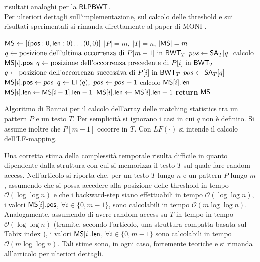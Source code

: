 risultati analoghi per la $\mbox{\rm {\sf RLPBWT}}$.\\
Per ulteriori dettagli sull'implementazione, sul calcolo delle
threshold e sui risultati sperimentali si rimanda direttamente al paper
di MONI \cite{moni}.
\begin{algorithm}
  \footnotesize
  \begin{algorithmic}[1]
    \State $\mbox{\rm {\sf MS}}\gets[(\mbox{\rm {\sf pos}} : 0, \mbox{\rm {\sf len}} : 0) \ldots (0, 0)]$
    \Comment $|P| = m$, $|T| = n$, $|\mbox{\rm {\sf MS}}| = m$
    \State $q\gets\mbox{posizione dell'ultima occorrenza di }P[m-1] \mbox{ in }
    \mbox{\rm {\sf BWT}}_T$ 
    \State $pos \gets \mbox{\rm {\sf SA}}_T[q]$
    \Comment calcolo $\mbox{\rm {\sf MS}}[i].\mbox{\rm {\sf pos}}$
    \State $q\gets\mbox{posizione dell'occorrenza precedente di }P[i] \mbox{ in
    } \mbox{\rm {\sf BWT}}_T$
    \Else
    \State $q\gets\mbox{posizione dell'occorrenza successiva di }P[i] \mbox{ in
    } \mbox{\rm {\sf BWT}}_T$
    \EndIf
    \State $pos\gets \mbox{\rm {\sf SA}}_T[q]$
    \EndIf
    \State $\mbox{\rm {\sf MS}}[i].\mbox{\rm {\sf pos}} \gets pos$
    \State $q\gets \mbox{\rm {\sf LF}}(q),\,\,pos\gets pos-1$
    \EndFor
    \Comment calcolo $\mbox{\rm {\sf MS}}[i].\mbox{\rm {\sf len}}$
    \State $\mbox{\rm {\sf MS}}[i].\mbox{\rm {\sf len}}\gets \mbox{\rm {\sf MS}}[i-1].\mbox{\rm {\sf len}}-1$
    \State  $\mbox{\rm {\sf MS}}[i].\mbox{\rm {\sf len}}\gets \mbox{\rm {\sf MS}}[i].\mbox{\rm {\sf len}}+1$
    \EndWhile
    \EndFor
    \State \textbf{return} $\mbox{\rm {\sf MS}}$
    \EndFunction
  \end{algorithmic}
  \caption{Algoritmo di Bannai per il calcolo dell'array delle matching
  statistics tra un 
  pattern $P$ e un testo $T$. Per
  semplicità si ignorano i casi in cui $q$ non è definito. Si
  assume inoltre che $P[m-1]$ occorre in $T$. Con $LF(\cdot)$ si intende il
  calcolo dell'LF-mapping.}
  \label{algo:bannai}
\end{algorithm}
Una corretta stima della complessità temporale risulta difficile in quanto 
dipendente dalla struttura con cui si memorizza il testo $T$ sul quale fare 
random access. Nell'articolo si riporta che, per un testo $T$ lungo
 $n$ e un pattern $P$ lungo $m$, assumendo che si possa accedere
alla posizione delle threshold in tempo $\mathcal{O}(\log\log n)$ e che 
i backward-step siano effettuabili in tempo $\mathcal{O}(\log\log n)$, i valori
$\mbox{\rm {\sf MS}}[i].\mbox{\rm {\sf pos}}$, $\forall i\in\{0,m-1\}$, sono calcolabili in tempo 
$\mathcal{O}(m\log\log n)$.
Analogamente, assumendo di avere random access su $T$ in tempo in tempo 
$\mathcal{O}(\log\log n)$ (tramite, secondo l'articolo, una struttura compatta
basata sul Tabix index \cite{tabix}), i valori
$\mbox{\rm {\sf MS}}[i].\mbox{\rm {\sf len}}$, $\forall i\in\{0,m-1\}$ sono calcolabili in tempo 
$\mathcal{O}(m\log\log n)$. Tali stime sono, in ogni caso, fortemente teoriche e
si rimanda all'articolo per ulteriori dettagli.
